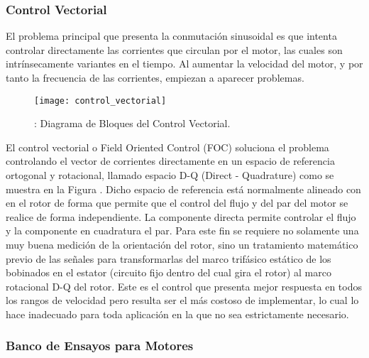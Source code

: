 \subsubsection{Control Vectorial}
\label{subsubsection: control_vectorial}

El problema principal que presenta la conmutación sinusoidal es que intenta controlar directamente las corrientes que circulan por el motor, las cuales son intrínsecamente variantes en el tiempo. Al aumentar la velocidad del motor, y por tanto la frecuencia de las corrientes, empiezan a aparecer problemas.

\begin{figure}[h]
  \centering
  \texttt{[image: control\_vectorial]}
  \caption{: Diagrama de Bloques del Control Vectorial.}\label{fig:control_vectorial}
\end{figure}

El control vectorial o Field Oriented Control (FOC) soluciona el problema controlando el vector de corrientes directamente en un espacio de referencia ortogonal y rotacional, llamado espacio D-Q (Direct - Quadrature) como se muestra en la Figura . Dicho
espacio de referencia está normalmente alineado con en el rotor de forma que permite que el control del flujo y del par del motor se realice de forma independiente. La componente directa permite controlar el flujo y la componente en cuadratura el par. Para este fin se requiere no solamente una muy buena medición de la orientación del rotor, sino un tratamiento matemático previo de las señales para transformarlas del marco trifásico estático de los bobinados en el estator (circuito fijo dentro del cual gira el rotor) al marco rotacional D-Q del rotor. Este es el control que presenta mejor respuesta en todos los rangos de velocidad pero resulta ser el más costoso de implementar, lo cual lo hace inadecuado para toda aplicación en la que no sea estrictamente necesario.




\pagebreak

\subsubsection{Banco de Ensayos para Motores}
\label{subsubsection: banco_ensayos}


